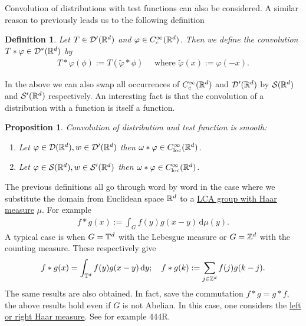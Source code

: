 \documentclass[12pt]{article}
\newtheorem{proposition}{Proposition}
\newtheorem{definition}{Definition}
\theoremstyle{remark}
\newcommand{\tl}[1]{\widetilde{#1}}
\renewcommand{\d}{\,\mathrm{d}}
\begin{document}
Convolution of distributions with test functions can also be considered. A similar reason to previously leads us to the following definition
\begin{definition}
	Let $T \in \mathcal{D}'(\mathbb{R}^d)$ and $\varphi \in C_c^\infty(\mathbb{R}^d)$. Then we define the convolution $T*\varphi \in \mathcal{D}^*(\mathbb{R}^d)$ by
	\begin{align*}
		T*\varphi(\phi):=T(\tl{\varphi}*\phi) \quad \text{ where } \tl{\varphi}(x):=\varphi(-x) .
	\end{align*}
\end{definition}
In the above we can also swap all occurrences of $C_c^\infty(\mathbb{R}^d)$ and $\mathcal{D}'(\mathbb{R}^d)$ by $\mathcal{S}(\mathbb{R}^d)$ and $\mathcal{S}'(\mathbb{R}^d)$ respectively. An interesting fact is that the convolution of a distribution with a function is itself a function.
\begin{proposition}Convolution of distribution and test function is smooth:
	\begin{enumerate}        \item Let $\varphi \in \mathcal{D}(\mathbb{R}^d), w \in \mathcal{D}'(\mathbb{R}^d) $ then $\omega * \varphi \in  C^\infty _{\mathrm{loc}}(\mathbb{R}^d)$.
		\item  Let $\varphi \in \mathcal{S}(\mathbb{R}^d), w \in \mathcal{S}'(\mathbb{R}^d) $ then $\omega * \varphi \in  C^\infty _{\mathrm{loc}}(\mathbb{R}^d)$.
	\end{enumerate}
\end{proposition}
The previous definitions all go through word by word in the case where we substitute the domain from Euclidean space  $\mathbb{R}^d$ to a \href{https://nowheredifferentiable.com/2023-01-29-PDE-1-Fourier/#:~:text=Since-,every,-locally%20compact%20Hausdorff}{LCA group with Haar measure} $\mu $. For example
\begin{align*}
	f*g(x):= \int_{G}f(y)g(x-y) \d \mu (y).
\end{align*}
A typical case is when $G=\mathbb{T}^d$ with the Lebesgue measure or $G=\mathbb{Z}^d$ with the counting measure. These respectively give
\begin{align*}
	f*g(x)=\int_{\T^d}f(y)g(x-y) \d y; \quad      f*g(k):= \sum_{j\in \Z^d} f(j)g(k-j)  .
\end{align*}
The same results are also obtained. In fact, save the commutation $f*g=g*f$, the above results hold even if $G$ is not Abelian. In this case, one considers the \href{https://en.wikipedia.org/wiki/Haar_measure#:~:text=%5Bedit%5D-,There,-is%2C%20up}{left or right Haar measure}. See for example \cite{fremlin2006measure} 444R.
\end{document}
